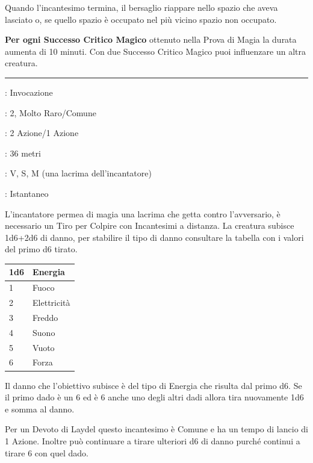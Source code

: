 \begin{multicols}{2}
Quando l'incantesimo termina, il bersaglio riappare nello spazio che aveva lasciato o, se quello spazio è occupato nel più vicino spazio non occupato.

\textbf{Per ogni Successo Critico Magico} ottenuto nella Prova di Magia la durata aumenta di 10 minuti. Con due Successo Critico Magico puoi influenzare un altra creatura.

\smallskip\noindent\rule{\linewidth}{2pt} \hypertarget{Lacrima di Laydel}{}\medskip{}
\noindent
\begin{description}[noitemsep, topsep=0pt, parsep=0pt, partopsep=0pt, leftmargin=0cm, labelwidth=2.8cm]
	\item[\textbf{Lista di Magia}]: Invocazione
	\item[\textbf{Livello}]: 2, Molto Raro/Comune
	\item[\textbf{T. di Lancio}]: 2 Azione/1 Azione
	\item[\textbf{Gittata}]: 36 metri
	\item[\textbf{Componenti}]: V, S, M (una lacrima dell'incantatore)
	\item[\textbf{Durata}]: Istantaneo
\end{description}

L'incantatore permea di magia una lacrima che getta contro l'avversario, è necessario un Tiro per Colpire con Incantesimi a distanza.
La creatura subisce 1d6+2d6 di danno, per stabilire il tipo di danno consultare la tabella con i valori del primo d6 tirato.

\medskip

\begin{tabular}{l|l}
	\textbf{1d6}&\textbf{Energia}\\
	\hline
	1 &Fuoco\\
	2 &Elettricità\\
	3 &Freddo\\
	4 &Suono\\
	5 &Vuoto\\
	6 &Forza
\end{tabular}

\medskip

Il danno che l'obiettivo subisce è del tipo di Energia che risulta dal primo d6. Se il primo dado è un 6 ed è 6 anche uno degli altri dadi allora tira nuovamente 1d6 e somma al danno.

Per un Devoto di Laydel questo incantesimo è Comune e ha un tempo di lancio di 1 Azione. Inoltre può continuare a tirare ulteriori d6 di danno purché continui a tirare 6 con quel dado.


\end{multicols}
